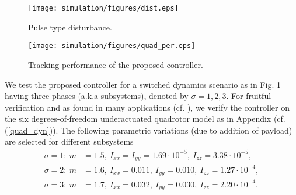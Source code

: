 \documentclass[AMA,STIX1COL,sort, compress]{WileyNJD-v2}
\begin{document}
\begin{figure}[!t]
	\centering
	\texttt{[image: simulation/figures/dist.eps]}%
	\caption{{Pulse type disturbance.}}\label{fig:dist} %
\end{figure}

\begin{figure}[!t]
	\centering
	\texttt{[image: simulation/figures/quad\_per.eps]}%
	\caption{{Tracking performance of the proposed controller.}}\label{fig:2} %
\end{figure}
We test the proposed controller for a switched dynamics scenario as in Fig. 1 having three phases (a.k.a subsystems), denoted by $\sigma=1,2,3$. For fruitful verification and as found in many applications (cf. \cite{ye2019observer,roy2018analysis}), we verify the controller on the six degrees-of-freedom underactuated quadrotor model as in Appendix (cf. (\ref{quad_dyn})). The following parametric variations (due to addition of payload) are selected for different subsystems
\begin{align*}
\sigma=1: ~m & =1.5,~I_{xx}=I_{yy}=1.69\cdot10^{-5},~ I_{zz}=3.38\cdot10^{-5},\\
\sigma=2: ~m & =1.6,~I_{xx}=0.011,~ I_{yy}=0.010,~ I_{zz}=1.27\cdot10^{-4},\\
\sigma=3: ~m& =1.7,~I_{xx}=0.032,~ I_{yy}=0.030,~ I_{zz}=2.20\cdot{10}^{-4}.
\end{align*}
\end{document}
